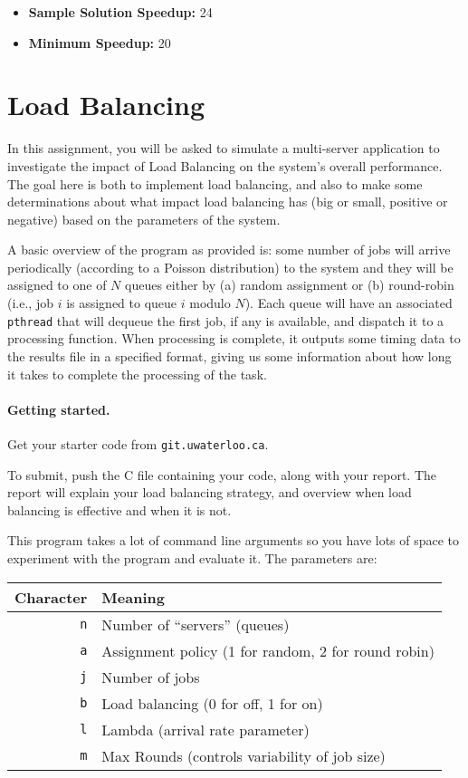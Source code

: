 \documentclass[letterpaper,10pt]{article}
\begin{document}
\begin{itemize}
\item \textbf{Sample Solution Speedup:} 24
\item \textbf{Minimum Speedup:} 20
\end{itemize}

\section{Load Balancing}

In this assignment, you will be asked to simulate a multi-server application to investigate the impact of Load Balancing on the system's overall performance. The goal here is both to implement load balancing, and also to make some determinations about what impact load balancing has (big or small, positive or negative) based on the parameters of the system. 

A basic overview of the program as provided is: some number of jobs will arrive periodically (according to a Poisson distribution) to the system and they will be assigned to one of $N$ queues either by (a) random assignment or (b) round-robin (i.e., job $i$ is assigned to queue $i$ modulo $N$). Each queue will have an associated \texttt{pthread} that will dequeue the first job, if any is available, and dispatch it to a processing function. When processing is complete, it outputs some timing data to the results file in a specified format, giving us some information about how long it takes to complete the processing of the task.


\paragraph{Getting started.} Get your starter code from \texttt{git.uwaterloo.ca}.

To submit, push the C file containing your code, along with your report. The report will explain your load balancing strategy, and overview when load balancing is effective and when it is not.

This program takes a lot of command line arguments so you have lots of space to experiment with the program and evaluate it. The parameters are:

\begin{center}
	\begin{tabular}{r|l}
	\textbf{Character} & \textbf{Meaning} \\ \hline
	\texttt{n} & Number of ``servers'' (queues) \\
	\texttt{a} & Assignment policy (1 for random, 2 for round robin) \\
	\texttt{j} & Number of jobs \\
	\texttt{b} & Load balancing (0 for off, 1 for on) \\
	\texttt{l} & Lambda (arrival rate parameter) \\
	\texttt{m} & Max Rounds (controls variability of job size) \\
	\end{tabular}
\end{center}
\end{document}
